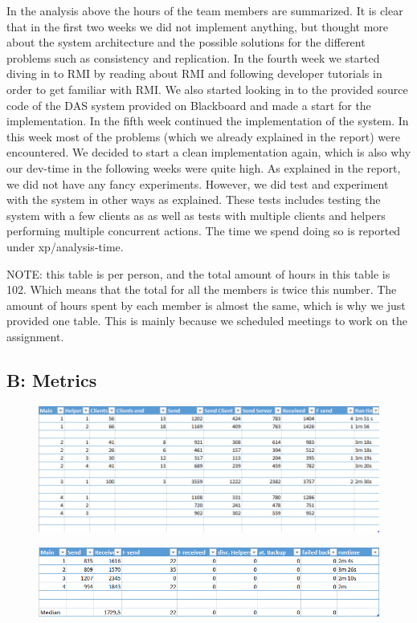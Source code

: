 In the analysis above the hours of the team members are summarized. 
It is clear that in the first two weeks we did not implement anything, but thought more about the system architecture and the possible solutions for the different problems such as consistency and replication.
In the fourth week we started diving in to RMI by reading about RMI and following developer tutorials in order to get familiar with  RMI.
We also started looking in to the provided source code of the DAS system provided on Blackboard and made a start for the implementation.
In the fifth week continued the implementation of the system.
In this week most of the problems (which we already explained in the report) were encountered. 
We decided to start a clean implementation again, which is also why our dev-time in the following weeks were quite high.
As explained in the report, we did not have any fancy experiments. 
However, we did test and experiment with the system in other ways as explained.
These tests includes testing the system with a few clients as as well as tests with multiple clients and helpers performing multiple concurrent actions.
The time we spend doing so is reported under xp/analysis-time.

NOTE: this table is per person, and the total amount of hours in this table is 102.
Which means that the total for all the members is twice this number.
The amount of hours spent by each member is almost the same, which is why we just provided one table.
This is mainly because we scheduled meetings to work on the assignment.

\subsection{B: Metrics}
\begin{figure}[ht]
\includegraphics[scale=0.5]{M1.png}
\end{figure}

\begin{figure}[ht]
\includegraphics[scale=0.5]{M2.png}
\end{figure}


